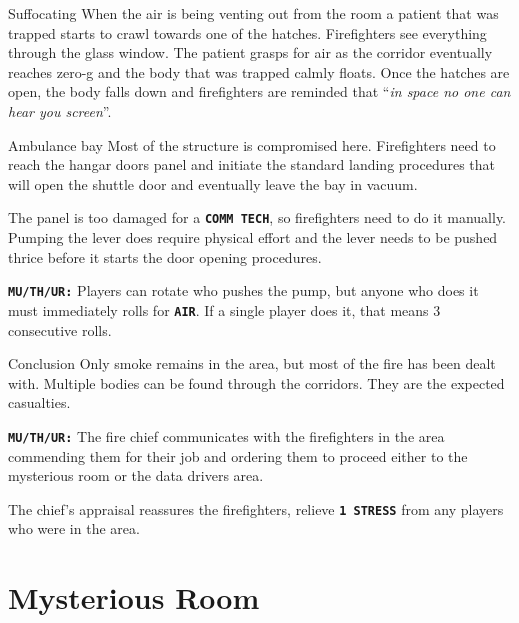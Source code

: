 \begin{rpg-warnbox}{Suffocating}
    When the air is being venting out from the room a patient that was trapped starts to crawl towards one of the hatches. Firefighters see everything through the glass window. The patient grasps for air as the corridor eventually reaches zero-g and the body that was trapped calmly floats. Once the hatches are open, the body falls down and firefighters are reminded that ``\textit{in space no one can hear you screen}''.
\end{rpg-warnbox}
  



\begin{rpg-commentbox}{Ambulance bay}
    Most of the structure is compromised here. Firefighters need to reach the hangar doors panel and initiate the standard landing procedures that will open the shuttle door and eventually leave the bay in vacuum. 

    The panel is too damaged for a \texttt{\textbf{COMM TECH}}, so firefighters need to do it manually. Pumping the lever does require  physical effort and the lever needs to be pushed thrice before it starts the door opening procedures. 

    \texttt{\textbf{MU/TH/UR:}} Players can rotate who pushes the pump, but anyone who does it must immediately rolls for \texttt{\textbf{AIR}}. If a single player does it, that means 3 consecutive rolls.
\end{rpg-commentbox}  

\newsect


\begin{rpg-commentbox}{Conclusion}
    Only smoke remains in the area, but most of the fire has been dealt with. Multiple bodies can be found through the corridors. They are the expected casualties.
    
    \texttt{\textbf{MU/TH/UR:}} The fire chief communicates with the firefighters in the area commending them for their job  and ordering them to proceed either to the mysterious room or the data drivers area. 

    The chief's appraisal reassures the firefighters, relieve \texttt{\textbf{1 STRESS}} from any players who were in the area.
\end{rpg-commentbox}  



\clearpage

\section{Mysterious Room}




